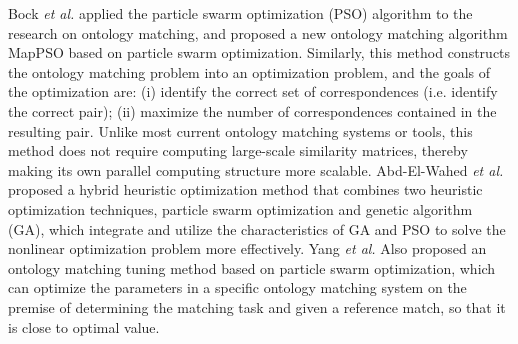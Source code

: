 \documentclass[twoside]{article}
\begin{document}
\begin{multicols}{2}
Bock {\it et al.} applied the particle swarm optimization (PSO) algorithm to the research on ontology matching, and proposed a new ontology matching algorithm MapPSO based on particle swarm optimization\cite{wwy46}. 
Similarly, this method constructs the ontology matching problem into an optimization problem, and the goals of the optimization are: (i) identify the correct set of correspondences (i.e. identify the correct pair); (ii) maximize the number of correspondences contained in the resulting pair. Unlike most current ontology matching systems or tools, this method does not require computing large-scale similarity matrices, thereby making its own parallel computing structure more scalable. 
Abd-El-Wahed {\it et al.} proposed a hybrid heuristic optimization method that combines two heuristic optimization techniques, particle swarm optimization and genetic algorithm (GA)\cite{wwy47}, which integrate and utilize the characteristics of GA and PSO to solve the nonlinear optimization problem more effectively. 
Yang {\it et al.} Also proposed an ontology matching tuning method based on particle swarm optimization\cite{wwy48}, which can optimize the parameters in a specific ontology matching system on the premise of determining the matching task and given a reference match, so that it is close to optimal value.


\end{multicols}
\end{document}
